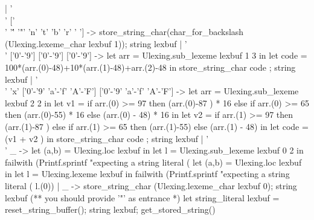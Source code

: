 \begin{enumerate}
\begin{enumerate}
\begin{bluecode}
  | '\\' ['\\' '\'' '"' 'n' 't' 'b' 'r' ' '] -> 
    store_string_char(char_for_backslash (Ulexing.lexeme_char lexbuf 1));
    string lexbuf 
  | '\\' ['0'-'9'] ['0'-'9'] ['0'-'9'] -> 
    let arr = Ulexing.sub_lexeme lexbuf 1 3 in 
    let code = 100*(arr.(0)-48)+10*(arr.(1)-48)+arr.(2)-48 in 
    store_string_char code ; 
    string lexbuf 
  | '\\' 'x' ['0'-'9' 'a'-'f' 'A'-'F'] ['0'-'9' 'a'-'f' 'A'-'F'] ->
    let arr = Ulexing.sub_lexeme lexbuf 2 2 in 
    let v1 = 
      if arr.(0) >= 97 
      then (arr.(0)-87 ) * 16 
      else if arr.(0) >= 65 
      then (arr.(0)-55) * 16 
      else (arr.(0) - 48) * 16 in
    let v2 = 
      if arr.(1) >= 97 
      then (arr.(1)-87 ) 
      else if arr.(1) >= 65 
      then (arr.(1)-55) 
      else (arr.(1) - 48) in 
    let code = (v1 + v2 ) in 
    store_string_char code ; 
    string lexbuf 
  | '\\' _ -> 
    let (a,b) = Ulexing.loc lexbuf in 
    let l = Ulexing.sub_lexeme lexbuf 0 2  in
    failwith 
    (Printf.sprintf 
       "expecting a string literal (%
    let (a,b) = Ulexing.loc lexbuf in 
    let l = Ulexing.lexeme lexbuf in
    failwith 
    (Printf.sprintf 
       "expecting a string literal (%
        l.(0))
  | _ -> 
    store_string_char (Ulexing.lexeme_char lexbuf 0);
    string lexbuf 
(** you should provide '"' as entrance *)
let string_literal lexbuf = 
  reset_string_buffer();
  string lexbuf;
  get_stored_string()
  
\end{bluecode}


% 
  \end{enumerate}
\end{enumerate}

